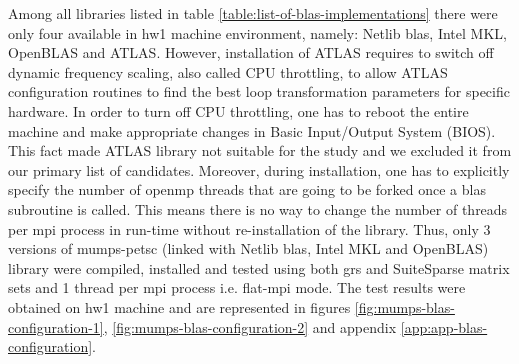 Among all libraries listed in table \ref{table:list-of-blas-implementations} there were only four available in \gls{hw1} machine environment, namely: Netlib \gls{blas}, Intel MKL, OpenBLAS and ATLAS. However, installation of ATLAS requires to switch off dynamic frequency scaling, also called CPU throttling, to allow ATLAS configuration routines to find the best loop transformation parameters for specific hardware. In order to turn off CPU throttling, one has to reboot the entire machine and make appropriate changes in Basic Input/Output System (BIOS). This fact made ATLAS library not suitable for the study and we excluded it from our primary list of candidates. Moreover, during installation, one has to explicitly specify the number of \gls{openmp} threads that are going to be forked once a \gls{blas} subroutine is called. This means there is no way to change the number of threads per \gls{mpi} process in run-time without re-installation of the library. Thus, only 3 versions of \gls{mumps}-\gls{petsc} (linked with Netlib \gls{blas}, Intel MKL and OpenBLAS) library were compiled, installed and tested using both \gls{grs} and SuiteSparse matrix sets and 1 thread per \gls{mpi} process i.e. flat-\gls{mpi} mode. The test results were obtained on \gls{hw1} machine and are represented in figures \ref{fig:mumps-blas-configuration-1}, \ref{fig:mumps-blas-configuration-2} and appendix \ref{app:app-blas-configuration}.\\


